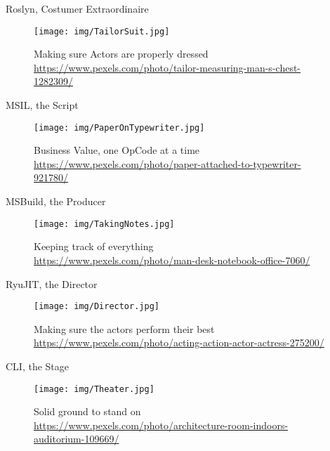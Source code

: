\documentclass[10pt]{beamer}
\begin{document}
\begin{frame}{Roslyn, Costumer Extraordinaire}
    \begin{figure}
        \centering
        \texttt{[image: img/TailorSuit.jpg]}
        \caption{Making sure Actors are properly dressed \\ \tiny{\href{Photo by rawpixel.com from Pexels}{https://www.pexels.com/photo/tailor-measuring-man-s-chest-1282309/}}}
    \end{figure}
\end{frame}

\begin{frame}{MSIL, the Script}
    \begin{figure}
        \centering
        \texttt{[image: img/PaperOnTypewriter.jpg]}
        \caption{Business Value, one OpCode at a time \\ \tiny{\href{Photo by rawpixel.com from Pexels}{https://www.pexels.com/photo/paper-attached-to-typewriter-921780/}}}
    \end{figure}    
\end{frame}

\begin{frame}{MSBuild, the Producer}
    \begin{figure}
        \centering
        \texttt{[image: img/TakingNotes.jpg]}
        \caption{Keeping track of everything \\ \tiny{\href{Photo by Startup Stock Photos from Pexels}{https://www.pexels.com/photo/man-desk-notebook-office-7060/}}}
    \end{figure}
\end{frame}

\begin{frame}{RyuJIT, the Director}
    \begin{figure}
        \centering
        \texttt{[image: img/Director.jpg]}
        \caption{Making sure the actors perform their best \\ \tiny{\href{Photo by Pixabay from Pexels}{https://www.pexels.com/photo/acting-action-actor-actress-275200/}}}
    \end{figure}
\end{frame}

\begin{frame}{CLI, the Stage}
    \begin{figure}
        \centering
        \texttt{[image: img/Theater.jpg]}
        \caption{Solid ground to stand on \\ \tiny{\href{Photo by Donald Tong from Pexels}{https://www.pexels.com/photo/architecture-room-indoors-auditorium-109669/}}}
    \end{figure}
\end{frame}
\end{document}

